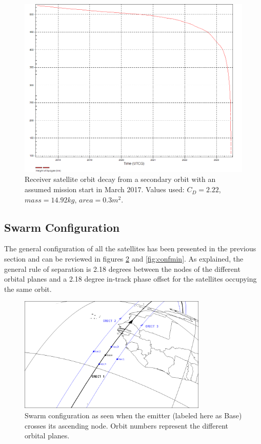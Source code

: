 \begin{landscape}
\begin{figure}[ht!]
\centering
\includegraphics[width = \textheight]{chapters/img/receiverDecay2nd.png}
\caption{Receiver satellite orbit decay from a secondary orbit with an assumed mission start in March 2017. Values used: $C_D = 2.22$, $mass = 14.92 kg$, $area = 0.3 m^2$.}
\label{fig:recLife2}
\end{figure}
\end{landscape}

\subsection{Swarm Configuration}
\label{frSSSC}

The general configuration of all the satellites has been presented in the previous section and can be reviewed in figures \ref{fig:confmax} and \ref{fig:confmin}. As explained, the general rule of separation is 2.18 degrees between the nodes of the different orbital planes and a 2.18 degree in-track phase offset for the satellites occupying the same orbit. 

\begin{figure}[!h]
\centering
\includegraphics[width=0.8\textwidth, angle=0]{chapters/img/primaryconfmax.png}
\caption{Swarm configuration as seen when the emitter (labeled here as Base) crosses its ascending node. Orbit numbers represent the different orbital planes.}
\label{fig:confmax}
\end{figure}

